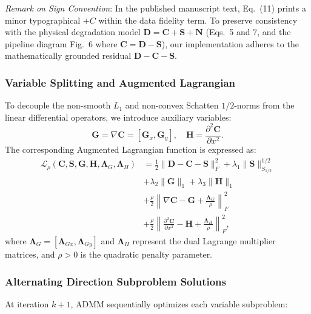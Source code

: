 \textit{Remark on Sign Convention}: In the published manuscript text, Eq.~(11) prints a minor typographical $+C$ within the data fidelity term. To preserve consistency with the physical degradation model $\mathbf{D} = \mathbf{C} + \mathbf{S} + \mathbf{N}$ (Eqs.~5 and 7, and the pipeline diagram Fig.~6 where $\mathbf{C} = \mathbf{D} - \mathbf{S}$), our implementation adheres to the mathematically grounded residual $\mathbf{D} - \mathbf{C} - \mathbf{S}$.

\subsubsection{Variable Splitting and Augmented Lagrangian}
To decouple the non-smooth $L_1$ and non-convex Schatten $1/2$-norms from the linear differential operators, we introduce auxiliary variables:
\begin{equation}
\label{eq:variable_splitting}
\mathbf{G} = \nabla \mathbf{C} = [\mathbf{G}_x, \mathbf{G}_y], \quad \mathbf{H} = \frac{\partial^2 \mathbf{C}}{\partial x^2}.
\end{equation}
The corresponding Augmented Lagrangian function is expressed as:
\begin{align}
\label{eq:augmented_lagrangian}
\mathcal{L}_\rho(\mathbf{C}, \mathbf{S}, \mathbf{G}, \mathbf{H}, \mathbf{\Lambda}_G, \mathbf{\Lambda}_H) &= \frac{1}{2} \|\mathbf{D} - \mathbf{C} - \mathbf{S}\|_F^2 + \lambda_1 \|\mathbf{S}\|_{S_{1/2}}^{1/2} \nonumber \\
&+ \lambda_2 \|\mathbf{G}\|_1 + \lambda_3 \|\mathbf{H}\|_1 \nonumber \\
&+ \frac{\rho}{2} \left\| \nabla \mathbf{C} - \mathbf{G} + \frac{\mathbf{\Lambda}_G}{\rho} \right\|_F^2 \nonumber \\
&+ \frac{\rho}{2} \left\| \frac{\partial^2 \mathbf{C}}{\partial x^2} - \mathbf{H} + \frac{\mathbf{\Lambda}_H}{\rho} \right\|_F^2,
\end{align}
where $\mathbf{\Lambda}_G = [\mathbf{\Lambda}_{Gx}, \mathbf{\Lambda}_{Gy}]$ and $\mathbf{\Lambda}_H$ represent the dual Lagrange multiplier matrices, and $\rho > 0$ is the quadratic penalty parameter.

\subsubsection{Alternating Direction Subproblem Solutions}
At iteration $k+1$, ADMM sequentially optimizes each variable subproblem:

